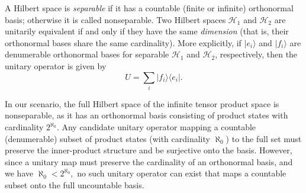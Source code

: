 \documentclass[shortAfour,sageh,times]{sagej}
\begin{document}

A Hilbert space is \emph{separable} if it has a countable (finite or infinite) orthonormal basis; otherwise it is called nonseparable.
Two Hilbert spaces $\mathcal{H}_1$ and $\mathcal{H}_2$ are unitarily equivalent if and only if they have the same \emph{dimension} (that is, their orthonormal bases share the same cardinality).
More explicitly, if \(\vert e_i \rangle\) and \(\vert f_i \rangle\) are denumerable orthonormal bases for separable \(\mathcal{H}_1\) and \(\mathcal{H}_2\), respectively, then the unitary operator is given by
\[
U = \sum_i \vert f_i \rangle \langle e_i \vert.
\]

In our scenario, the full Hilbert space of the infinite tensor product space is nonseparable, as it has an orthonormal basis consisting of product states with cardinality \(2^{\aleph_0}\).
Any candidate unitary operator mapping a countable (denumerable) subset of product states (with cardinality \(\aleph_0\)) to the full set must preserve the inner-product structure and be surjective onto the basis.
However, since a unitary map must preserve the cardinality of an orthonormal basis, and we have
\(
\aleph_0 < 2^{\aleph_0},
\)
no such unitary operator can exist that maps a countable subset onto the full uncountable basis.
\end{document}
